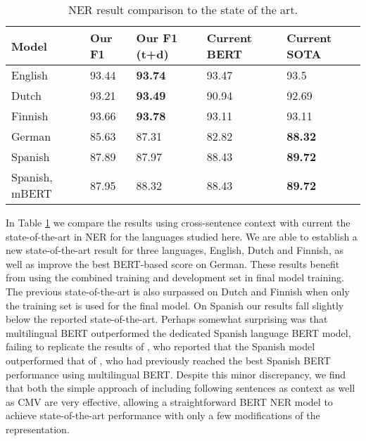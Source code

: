 \documentclass[11pt]{article}
\begin{document}
\begin{table}[t!]
\small
\centering
\begin{tabular}{l|llll}
Model         & Our F1 &  Our F1 (t+d) & Current BERT & Current SOTA    \\ \hline
English   & 93.44 & \textbf{93.74} & 93.47 \cite{Liu_2019} & 93.5 \cite{Baevski_2019}\\ \hline
Dutch   & 93.21 & \textbf{93.49} & 90.94 \cite{Wu_2019} & 92.69 \cite{strakova-etal-2019-neural}\\ \hline
Finnish        &  93.66 &  \textbf{93.78} & 93.11 \cite{luoma-EtAl:2020:LREC} & 93.11 \cite{luoma-EtAl:2020:LREC} \\ \hline
German  &  85.63 & 87.31 & 82.82 \cite{Wu_2019} & \textbf{88.32} \cite{akbik2018coling} \\ \hline
Spanish   & 87.89 & 87.97 & 88.43 \cite{CaneteCFP2020} & \textbf{89.72} \cite{conneau-etal-2020-unsupervised} \\ \hline
Spanish, mBERT   & 87.95 & 88.32 & 88.43 \cite{CaneteCFP2020} & \textbf{89.72} \cite{conneau-etal-2020-unsupervised} \\ \hline
\end{tabular}
\caption{NER result comparison to the state of the art.}
\label{ner-sota2}
\end{table}

In Table \ref{ner-sota2} we compare the results using cross-sentence context with current the state-of-the-art in NER for the languages studied here. We are able to establish a new state-of-the-art result for three languages, English, Dutch and Finnish, as well as improve the best BERT-based score on German. These results benefit from using the combined training and development set in final model training. The previous state-of-the-art is also surpassed on Dutch and Finnish when only the training set is used for the final model. On Spanish our results fall slightly below the reported state-of-the-art. Perhaps somewhat surprising was that multilingual BERT outperformed the dedicated Spanish language BERT model, failing to replicate the results of , who reported that the Spanish model outperformed that of , who had previously reached the best Spanish BERT performance using multilingual BERT.
Despite this minor discrepancy, we find that both the simple approach of including following sentences as context as well as CMV are very effective, allowing a straightforward BERT NER model to achieve state-of-the-art performance with only a few modifications of the representation.
\end{document}

